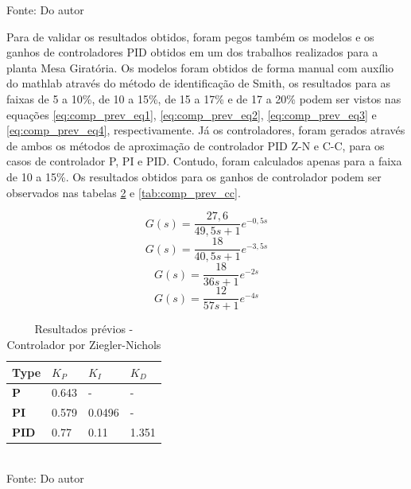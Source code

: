\begin{table}[H]
\begin{tabular}{|c|c|c|c|c|c|c|}
        \hline
    \end{tabular}
    \label{tab:results_tanque}
    \vspace{0cm}\hspace{0cm}\small{Fonte: Do autor}
\end{table}

Para de validar os resultados obtidos, foram pegos também os modelos e os ganhos de controladores PID obtidos em um dos
trabalhos realizados para a planta Mesa Giratória.
Os modelos foram obtidos de forma manual com auxílio do mathlab através do método de identificação de Smith, os
resultados para as faixas de 5 a 10\%, de 10 a 15\%, de 15 a 17\% e de 17 a 20\% podem ser vistos nas equações
\eqref{eq:comp_prev_eq1}, \eqref{eq:comp_prev_eq2}, \eqref{eq:comp_prev_eq3} e \eqref{eq:comp_prev_eq4}, respectivamente.
Já os controladores, foram gerados através de ambos os métodos de aproximação de controlador PID Z-N e C-C, para os
casos de controlador P, PI e PID. Contudo, foram calculados apenas para a faixa de 10 a 15\%.
Os resultados obtidos para os ganhos de controlador podem ser observados nas tabelas
\ref{tab:comp_prev_zn} e \ref{tab:comp_prev_cc}.

\begin{equation}
    \label{eq:comp_prev_eq1}
    G(s) = \frac{27,6}{49,5 s + 1}e^{-0,5 s}
\end{equation}
\begin{equation}
    \label{eq:comp_prev_eq2}
    G(s) = \frac{18}{40,5 s + 1}e^{-3,5 s}
\end{equation}
\begin{equation}
    \label{eq:comp_prev_eq3}
    G(s) = \frac{18}{36 s + 1}e^{-2 s}
\end{equation}
\begin{equation}
    \label{eq:comp_prev_eq4}
    G(s) = \frac{12}{57 s + 1}e^{-4 s}
\end{equation}

\begin{table}[H]
    \caption{Resultados prévios - Controlador por Ziegler-Nichols}
    \centering
    \begin{tabular}{|l|l|l|l|}
        \hline
        \textbf{Type} & \textbf{$K_P$} & \textbf{$K_I$} & \textbf{$K_D$} \\
        \hline
        \textbf{P}    & 0.643          & -              & -              \\
        \hline
        \textbf{PI}   & 0.579          & 0.0496         & -              \\
        \hline
        \textbf{PID}  & 0.77           & 0.11           & 1.351          \\
        \hline
    \end{tabular}
    \label{tab:comp_prev_zn}
    \\
    \vspace{0cm}\hspace{0cm}\small{Fonte: Do autor}
\end{table}

